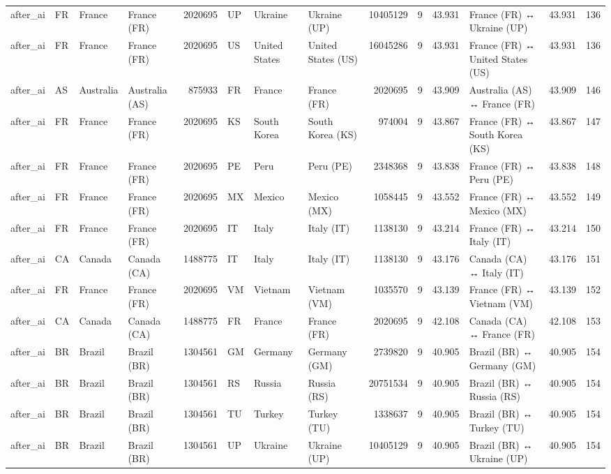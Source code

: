 \begin{tabular}{llllrlllrrrlrr}
after\_ai & FR & France & France (FR) & 2020695 & UP & Ukraine & Ukraine (UP) & 10405129 & 9 & 43.931 & France (FR) ↔ Ukraine (UP) & 43.931 & 136 \\
after\_ai & FR & France & France (FR) & 2020695 & US & United States & United States (US) & 16045286 & 9 & 43.931 & France (FR) ↔ United States (US) & 43.931 & 136 \\
after\_ai & AS & Australia & Australia (AS) & 875933 & FR & France & France (FR) & 2020695 & 9 & 43.909 & Australia (AS) ↔ France (FR) & 43.909 & 146 \\
after\_ai & FR & France & France (FR) & 2020695 & KS & South Korea & South Korea (KS) & 974004 & 9 & 43.867 & France (FR) ↔ South Korea (KS) & 43.867 & 147 \\
after\_ai & FR & France & France (FR) & 2020695 & PE & Peru & Peru (PE) & 2348368 & 9 & 43.838 & France (FR) ↔ Peru (PE) & 43.838 & 148 \\
after\_ai & FR & France & France (FR) & 2020695 & MX & Mexico & Mexico (MX) & 1058445 & 9 & 43.552 & France (FR) ↔ Mexico (MX) & 43.552 & 149 \\
after\_ai & FR & France & France (FR) & 2020695 & IT & Italy & Italy (IT) & 1138130 & 9 & 43.214 & France (FR) ↔ Italy (IT) & 43.214 & 150 \\
after\_ai & CA & Canada & Canada (CA) & 1488775 & IT & Italy & Italy (IT) & 1138130 & 9 & 43.176 & Canada (CA) ↔ Italy (IT) & 43.176 & 151 \\
after\_ai & FR & France & France (FR) & 2020695 & VM & Vietnam & Vietnam (VM) & 1035570 & 9 & 43.139 & France (FR) ↔ Vietnam (VM) & 43.139 & 152 \\
after\_ai & CA & Canada & Canada (CA) & 1488775 & FR & France & France (FR) & 2020695 & 9 & 42.108 & Canada (CA) ↔ France (FR) & 42.108 & 153 \\
after\_ai & BR & Brazil & Brazil (BR) & 1304561 & GM & Germany & Germany (GM) & 2739820 & 9 & 40.905 & Brazil (BR) ↔ Germany (GM) & 40.905 & 154 \\
after\_ai & BR & Brazil & Brazil (BR) & 1304561 & RS & Russia & Russia (RS) & 20751534 & 9 & 40.905 & Brazil (BR) ↔ Russia (RS) & 40.905 & 154 \\
after\_ai & BR & Brazil & Brazil (BR) & 1304561 & TU & Turkey & Turkey (TU) & 1338637 & 9 & 40.905 & Brazil (BR) ↔ Turkey (TU) & 40.905 & 154 \\
after\_ai & BR & Brazil & Brazil (BR) & 1304561 & UP & Ukraine & Ukraine (UP) & 10405129 & 9 & 40.905 & Brazil (BR) ↔ Ukraine (UP) & 40.905 & 154 \\

\end{tabular}
